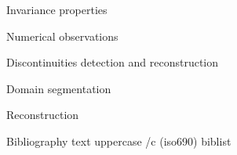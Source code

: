 \sec Invariance properties


\sec[numericalsec] Numerical observations


\chap Discontinuities detection\nl ^^J
      and reconstruction

\sec Domain segmentation

       

\sec Reconstruction

       












\def\_mtext#1{BIBLIOGRAPHY}
\let\uppercase\ignoreit
\nonum\chap Bibliography
\let\_mtext\omtext
\let\uppercase\_uppercase
\def\_opwarning#1{}
\usebib/c (iso690) biblist


\bye
